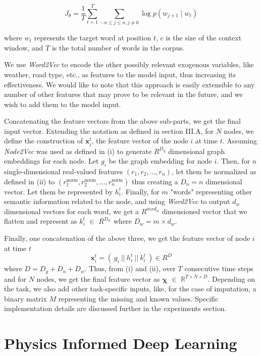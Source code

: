 \[
J_\theta = \frac{1}{T}\sum^{T}_{t=1}\sum_{-n\leq j \leq n, j \neq 0}\log p\left(w_{j+1} \mid w_{t}\right)
\]

where \( w_t \) represents the target word at position \( t \), \( c \) is the size of the context window, and \( T \) is the total number of words in the corpus.

We use \textit{Word2Vec} to encode the other possibly relevant exogenous variables, like weather, road type, etc., as features to the model input, thus increasing its effectiveness. We would like to note that this approach is easily extensible to any number of other features that may prove to be relevant in the future, and we wish to add them to the model input.

\vspace{3ex} Concatenating the feature vectors from the above sub-parts, we get the final input vector. Extending the notation as defined in section III.A, for \(N\) nodes, we define the construction of \(\mathbf{x}_i^t\), the feature vector of the node \(i\) at time \(t\). Assuming \textit{Node2Vec} was used as defined in (i) to generate \(R^{D_g}\) dimensional graph embeddings for each node. Let \(g_i\) be the graph embedding for node \(i\). Then, for \(n\) single-dimensional real-valued features \((r_1, r_2, \ldots, r_n)\), let them be normalized as defined in (ii) to \((r_1^{\text{norm}}, r_2^{\text{norm}}, \ldots, r_n^{\text{norm}})\) thus creating a \(D_n = n\) dimensional vector. Let them be represented by \(h_i^t\). Finally, for \(m\) "words" representing other semantic information related to the node, and using \textit{Word2Vec} to output \(d_w\) dimensional vectors for each word, we get a \(R^{mxd_w}\) dimensioned vector that we flatten and represent as \(k_i^t\) \(\in\) \(R^{D_w}\) where \(D_w = m \times d_w\).

Finally, one concatenation of the above three, we get the feature vector of node \(i\) at time \(t\) 
\[\mathbf{x}_i^t = (\ g_i\ ||\ h_i^t\ ||\ k_i^t\ ) \in R^D\] 
where \(D = D_g+D_n+D_w\).
Thus, from (i) and (ii), over \( T \) consecutive time steps and for \( N \) nodes, we get the final feature vector as \( \mathbf{\chi} \)  \(\in\) \( \mathbb{R}^{T \times N \times D} \).
Depending on the task, we also add other task-specific inputs, like, for the case of imputation, a binary matrix \( M \) representing the missing and known values. Specific implementation details are discussed further in the experiments section.

\section{\textbf{Physics Informed Deep Learning}}

